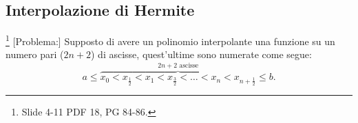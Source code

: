 %
%
%
%
%

\subsection{Interpolazione di Hermite}\footnote{Slide 4-11 PDF 18, PG 84-86.}
[Problema:] Supposto di avere un polinomio interpolante una funzione su un numero pari ($2n+2$) di ascisse, quest'ultime sono numerate come segue:
\begin{equation}\label{eq:ascisse_interpolazione_hermite}
    a\leq\overbrace{x_0 < x_{\frac{1}{2}} < x_1 < x_{\frac{3}{2}} < \hdots < x_n < x_{n+\frac{1}{2}}}^{2n+2\text{ ascisse}}\leq b.
\end{equation}

